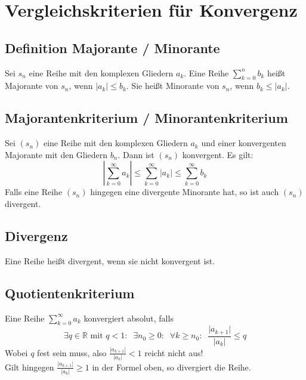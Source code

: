\documentclass[halfparscip]{scrartcl}
\newcounter{subsection2}
\begin{document}
\pagebreak
\setcounter{subsection2}{\value{subsection}}
\section*{Vergleichskriterien für Konvergenz}
\setcounter{subsection}{\value{subsection2}}
\subsection{Definition Majorante / Minorante}
Sei $s_n$ eine Reihe mit den komplexen Gliedern $a_k$. Eine Reihe $\sum_{k=0}^{n}b_k$ heißt Majorante von $s_n$, wenn $\vert a_k\vert \leq b_k$. Sie heißt Minorante von $s_n$, wenn $b_k \leq \vert{}a_k\vert$.

\subsection{Majorantenkriterium / Minorantenkriterium}
Sei $(s_n)$ eine Reihe mit den komplexen Gliedern $a_k$ und einer konvergenten Majorante mit den Gliedern $b_n$. Dann ist $(s_n)$ konvergent.
Es gilt:
\begin{equation*}
	\left\vert\sum_{k=0}^{\infty}a_k\right\vert \leq \sum_{k=0}^\infty \vert a_k\vert \leq \sum_{k=0}^\infty b_k
\end{equation*}
Falls eine Reihe $(s_n)$ hingegen eine divergente Minorante hat, so ist auch $(s_n)$ divergent.


\subsection{Divergenz}
Eine Reihe heißt divergent, wenn sie nicht konvergent ist.

\subsection{Quotientenkriterium}
Eine Reihe $\sum_{k=0}^\infty a_k$ konvergiert absolut, falls
\begin{equation*}
	\exists q \in \mathbb{R} \text{ mit } q < 1: \;\; \exists n_0 \geq 0: \;\; \forall k \geq n_0: \;\; \frac{\vert a_{k+1}\vert}{\vert a_k\vert} \leq q
\end{equation*}
Wobei $q$ fest sein muss, also $\frac{\vert a_{k+1}\vert}{\vert a_k\vert} < 1$ reicht nicht aus!\\
Gilt hingegen $\frac{\vert a_{k+1}\vert}{\vert a_k\vert} \geq 1$ in der Formel oben, so divergiert die Reihe.
\end{document}
